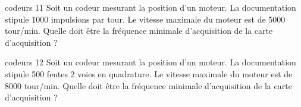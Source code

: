 {\begin{question}{codeurs 11} 
Soit un codeur mesurant la position d'un moteur. La documentation stipule 1000 impulsions par tour.
Le vitesse maximale du moteur est de 5000 tour/min. Quelle doit être la fréquence minimale d'acquisition de la carte d'acquisition ?
\end{question}

\begin{question}{codeurs 12}
Soit un codeur mesurant la position d'un moteur. La documentation stipule 500 fentes 2 voies en quadrature.
Le vitesse maximale du moteur est de 8000 tour/min. Quelle doit être la fréquence minimale d'acquisition de la carte d'acquisition ?

\end{question}


}